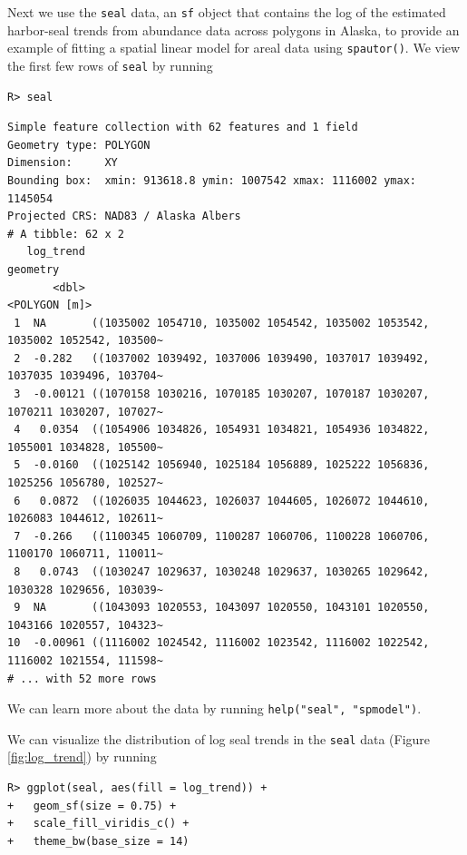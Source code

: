 \documentclass[10pt,letterpaper]{article}
\begin{document}
Next we use the \texttt{seal} data, an \texttt{sf} object that contains
the log of the estimated harbor-seal trends from abundance data across
polygons in Alaska, to provide an example of fitting a spatial linear
model for areal data using \texttt{spautor()}. We view the first few
rows of \texttt{seal} by running

\begin{verbatim}
R> seal
\end{verbatim}

\begin{verbatim}
Simple feature collection with 62 features and 1 field
Geometry type: POLYGON
Dimension:     XY
Bounding box:  xmin: 913618.8 ymin: 1007542 xmax: 1116002 ymax: 1145054
Projected CRS: NAD83 / Alaska Albers
# A tibble: 62 x 2
   log_trend                                                                      geometry
       <dbl>                                                                 <POLYGON [m]>
 1  NA       ((1035002 1054710, 1035002 1054542, 1035002 1053542, 1035002 1052542, 103500~
 2  -0.282   ((1037002 1039492, 1037006 1039490, 1037017 1039492, 1037035 1039496, 103704~
 3  -0.00121 ((1070158 1030216, 1070185 1030207, 1070187 1030207, 1070211 1030207, 107027~
 4   0.0354  ((1054906 1034826, 1054931 1034821, 1054936 1034822, 1055001 1034828, 105500~
 5  -0.0160  ((1025142 1056940, 1025184 1056889, 1025222 1056836, 1025256 1056780, 102527~
 6   0.0872  ((1026035 1044623, 1026037 1044605, 1026072 1044610, 1026083 1044612, 102611~
 7  -0.266   ((1100345 1060709, 1100287 1060706, 1100228 1060706, 1100170 1060711, 110011~
 8   0.0743  ((1030247 1029637, 1030248 1029637, 1030265 1029642, 1030328 1029656, 103039~
 9  NA       ((1043093 1020553, 1043097 1020550, 1043101 1020550, 1043166 1020557, 104323~
10  -0.00961 ((1116002 1024542, 1116002 1023542, 1116002 1022542, 1116002 1021554, 111598~
# ... with 52 more rows
\end{verbatim}

We can learn more about the data by running
\texttt{help("seal",\ "spmodel")}.

We can visualize the distribution of log seal trends in the
\texttt{seal} data (Figure\(~\)\ref{fig:log_trend}) by running

\begin{verbatim}
R> ggplot(seal, aes(fill = log_trend)) +
+   geom_sf(size = 0.75) +
+   scale_fill_viridis_c() +
+   theme_bw(base_size = 14)
\end{verbatim}
\end{document}
